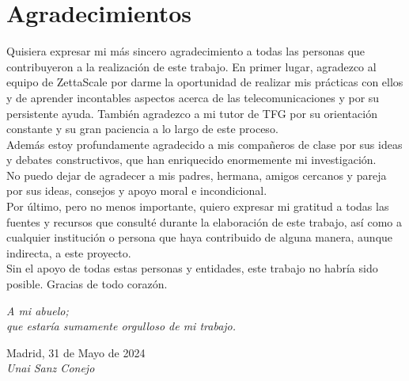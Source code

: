 \cleardoublepage

\chapter*{Agradecimientos}

Quisiera expresar mi más sincero agradecimiento a todas las personas que
contribuyeron a la realización de este trabajo. En primer lugar, agradezco al
equipo de ZettaScale por darme la oportunidad de realizar mis prácticas con
ellos y de aprender incontables aspectos acerca de las telecomunicaciones y por
su persistente ayuda. También agradezco a mi tutor de TFG por su orientación
constante y su gran paciencia a lo largo de este proceso.\\

Además estoy profundamente agradecido a mis compañeros de clase por sus ideas y
debates constructivos, que han enriquecido enormemente mi investigación.\\

No puedo dejar de agradecer a mis padres, hermana, amigos cercanos y pareja por
sus ideas, consejos y apoyo moral e incondicional.\\

Por último, pero no menos importante, quiero expresar mi gratitud a todas las
fuentes y recursos que consulté durante la elaboración de este trabajo, así como
a cualquier institución o persona que haya contribuido de alguna manera, aunque
indirecta, a este proyecto.\\

Sin el apoyo de todas estas personas y entidades, este trabajo no habría sido
posible. Gracias de todo corazón.\\


\begin{flushright}
		\vspace{1.5 cm}
		\emph{A mi abuelo;\\
      		  que estaría sumamente orgulloso de mi trabajo.}\\
		\par
		\vspace{1.0 cm}
		Madrid, 31 de Mayo de 2024\\ %
		\emph{Unai Sanz Conejo}
\end{flushright}

\thispagestyle{empty}

